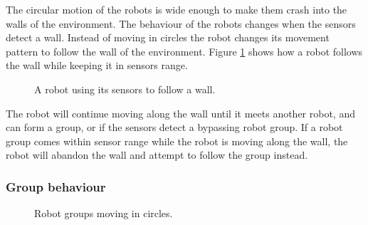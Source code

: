 The circular motion of the robots is wide enough to make them crash into the walls of the environment.
The behaviour of the robots changes when the sensors detect a wall.
Instead of moving in circles the robot changes its movement pattern to follow the wall of the environment.
Figure \ref{fig:individual-wall-drive} shows how a robot follows the wall while keeping it in sensors range.

\begin{figure}[H]    
	\centering
	\caption{A robot using its sensors to follow a wall.}
	\label{fig:individual-wall-drive}
\end{figure}


The robot will continue moving along the wall until it meets another robot, and can form a group, or if the sensors detect a bypassing robot group.
If a robot group comes within sensor range while the robot is moving along the wall, the robot will abandon the wall and attempt to follow the group instead.

\subsubsection{Group behaviour}


\begin{figure}[H]
	
	\centering
	\caption{Robot groups moving in circles.}
	\label{fig:group-circles}
\end{figure}

